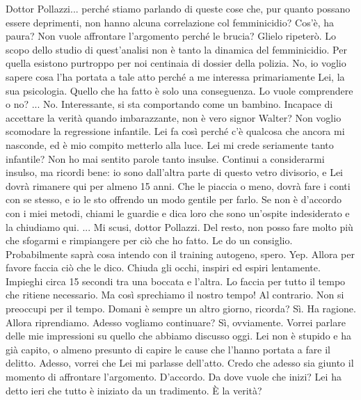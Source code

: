 \documentclass[a4paper,12pt]{article}
\newcommand{\Walter}{\speak{W}}
\newcommand{\Pollazzi}{\speak{P}}
\begin{document}
\begin{dialogue}
\Walter  Dottor Pollazzi... perché stiamo parlando di queste cose che, pur quanto possano essere deprimenti, non hanno alcuna correlazione col femminicidio? Cos'è, ha paura? Non vuole affrontare l'argomento perché le brucia?
\Pollazzi Glielo ripeterò. Lo scopo dello studio di quest'analisi non è tanto la dinamica del femminicidio. Per quella esistono purtroppo per noi centinaia di dossier della polizia. No, io voglio sapere cosa l'ha portata a tale atto perché a me interessa primariamente Lei, la sua psicologia. Quello che ha fatto è solo una conseguenza. Lo vuole comprendere o no?
\Walter  ... No.
\Pollazzi Interessante, si sta comportando come un bambino. Incapace di accettare la verità quando imbarazzante, non è vero signor Walter? Non voglio scomodare la regressione infantile. Lei fa così perché c'è qualcosa che ancora mi nasconde, ed è mio compito metterlo alla luce.
\Walter  Lei mi crede seriamente tanto infantile? Non ho mai sentito parole tanto insulse.
\Pollazzi Continui a considerarmi insulso, ma ricordi bene: io sono dall'altra parte di questo vetro divisorio, e Lei dovrà rimanere qui per almeno 15 anni. Che le piaccia o meno, dovrà fare i conti con se stesso, e io le sto offrendo un modo gentile per farlo. Se non è d'accordo con i miei metodi, chiami le guardie e dica loro che sono un'ospite indesiderato e la chiudiamo qui.
\Walter  ... Mi scusi, dottor Pollazzi. Del resto, non posso fare molto più che sfogarmi e rimpiangere per ciò che ho fatto.
\Pollazzi Le do un consiglio. Probabilmente saprà cosa intendo con il training autogeno, spero.
\Walter  Yep.
\Pollazzi Allora per favore faccia ciò che le dico. Chiuda gli occhi, inspiri ed espiri lentamente. Impieghi circa 15 secondi tra una boccata e l'altra. Lo faccia per tutto il tempo che ritiene necessario.
\Walter  Ma così sprechiamo il nostro tempo!
\Pollazzi Al contrario. Non si preoccupi per il tempo. Domani è sempre un altro giorno, ricorda?
\Walter  Sì. Ha ragione. Allora riprendiamo.
\Pollazzi Adesso vogliamo continuare?
\Walter  Sì, ovviamente.
\Pollazzi Vorrei parlare delle mie impressioni su quello che abbiamo discusso oggi. Lei non è stupido e ha già capito, o almeno presunto di capire le cause che l'hanno portata a fare il delitto. Adesso, vorrei che Lei mi parlasse dell'atto. Credo che adesso sia giunto il momento di affrontare l'argomento.
\Walter  D'accordo. Da dove vuole che inizi?
\Pollazzi Lei ha detto ieri che tutto è iniziato da un tradimento. È la verità?

\end{dialogue}
\end{document}
